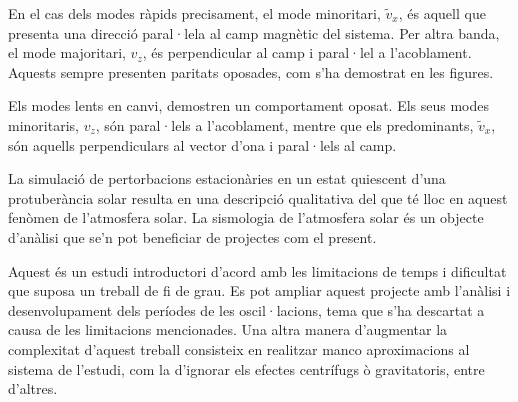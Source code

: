 En el cas dels modes ràpids precisament, el mode minoritari, $\tilde{v}_{x}$, és aquell que presenta una direcció paral·lela al camp magnètic del sistema.
Per altra banda, el mode majoritari, $v_z$, és perpendicular al camp i paral·lel a l'acoblament.
Aquests sempre presenten paritats oposades, com s'ha demostrat en les figures.

Els modes lents en canvi, demostren un comportament oposat. Els seus modes minoritaris, $v_z$, són paral·lels a l'acoblament,
mentre que els predominants, $\tilde{v}_{x}$, són aquells perpendiculars al vector d'ona i paral·lels al camp.

La simulació de pertorbacions estacionàries en un estat quiescent d'una protuberància solar resulta en una descripció qualitativa del que té lloc en aquest fenòmen de l'atmosfera solar.
La sismologia de l'atmosfera solar és un objecte d'anàlisi que se'n pot beneficiar de projectes com el present.

Aquest és un estudi introductori d'acord amb les limitacions de temps i dificultat que suposa un treball de fi de grau.
Es pot ampliar aquest projecte amb l'anàlisi i desenvolupament dels períodes de les oscil·lacions, tema que s'ha descartat a causa de les limitacions mencionades.
Una altra manera d'augmentar la complexitat d'aquest treball consisteix en realitzar manco aproximacions al sistema de l'estudi,
com la d'ignorar els efectes centrífugs ò gravitatoris, entre d'altres.